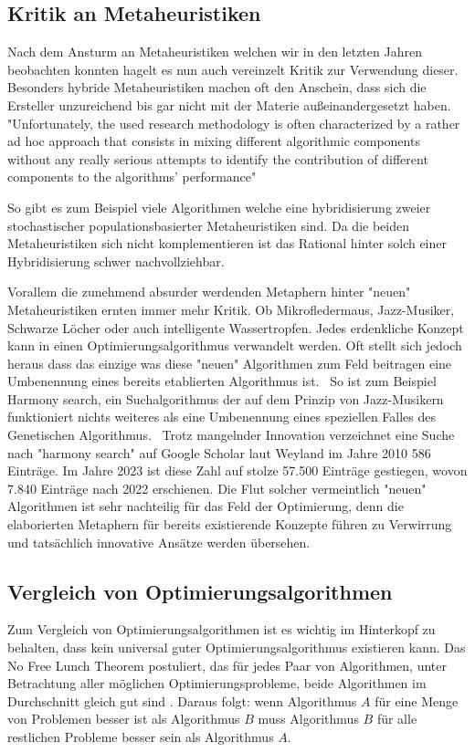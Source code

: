 \subsection{Kritik an Metaheuristiken}
Nach dem Ansturm an Metaheuristiken welchen wir in den letzten Jahren beobachten konnten hagelt es nun auch vereinzelt Kritik zur Verwendung dieser. Besonders hybride Metaheuristiken machen oft den Anschein, dass sich die Ersteller unzureichend bis gar nicht mit der Materie außeinandergesetzt haben.
"Unfortunately, the used research methodology is often
characterized by a rather ad hoc approach that consists in mixing different algorithmic components without any really serious
attempts to identify the contribution of different components to the
algorithms' performance" \cite*{MetaheuristicsSurvey}

So gibt es zum Beispiel viele Algorithmen welche eine hybridisierung zweier stochastischer populationsbasierter Metaheuristiken sind. Da die beiden Metaheuristiken sich nicht komplementieren ist das Rational hinter solch einer Hybridisierung schwer nachvollziehbar.

Vorallem die zunehmend absurder werdenden Metaphern hinter "neuen" Metaheuristiken ernten immer mehr Kritik. Ob Mikrofledermaus, Jazz-Musiker, Schwarze Löcher oder auch intelligente Wassertropfen. Jedes erdenkliche Konzept kann in einen Optimierungsalgorithmus verwandelt werden. Oft stellt sich jedoch heraus dass das einzige was diese "neuen" Algorithmen zum Feld beitragen eine Umbenennung eines bereits etablierten Algorithmus ist.~\cite*{NoNovelty} So ist zum Beispiel Harmony search, ein Suchalgorithmus der auf dem Prinzip von Jazz-Musikern funktioniert nichts weiteres als eine Umbenennung eines speziellen Falles des Genetischen Algorithmus.~\cite*{HarmonySearch} Trotz mangelnder Innovation verzeichnet eine Suche nach "harmony search" auf Google Scholar laut Weyland im Jahre 2010 586 Einträge. Im Jahre 2023 ist diese Zahl auf stolze 57.500 Einträge gestiegen, wovon 7.840 Einträge nach 2022 erschienen. Die Flut solcher vermeintlich "neuen" Algorithmen ist sehr nachteilig für das Feld der Optimierung, denn die elaborierten Metaphern für bereits existierende Konzepte führen zu Verwirrung und tatsächlich innovative Ansätze werden übersehen.~\cite*{MetaheuristicsExposed}

\subsection*{Vergleich von Optimierungsalgorithmen}
Zum Vergleich von Optimierungsalgorithmen ist es wichtig im Hinterkopf zu behalten, dass kein universal guter Optimierungsalgorithmus existieren kann. Das No Free Lunch Theorem postuliert, das für jedes Paar von Algorithmen, unter Betrachtung aller möglichen Optimierungsprobleme, beide Algorithmen im Durchschnitt gleich gut sind \cite*{NFL}. Daraus folgt: wenn Algorithmus $A$ für eine Menge von Problemen besser ist als Algorithmus $B$ muss Algorithmus $B$ für alle restlichen Probleme besser sein als Algorithmus $A$.